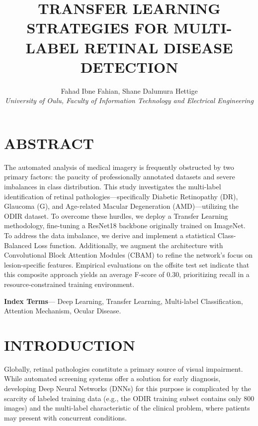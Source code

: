 \documentclass[10pt, letterpaper, twocolumn]{article}
\title{\vspace{0.38in} \fontsize{14}{17}\selectfont \textbf{TRANSFER LEARNING STRATEGIES FOR MULTI-LABEL RETINAL DISEASE DETECTION}}
\author{Fahad Ibne Fahian, Shane Dalumura Hettige \\ 
\textit{University of Oulu, Faculty of Information Technology and Electrical Engineering}}
\date{}
\begin{document}
\maketitle

\section*{ABSTRACT}
The automated analysis of medical imagery is frequently obstructed by two primary factors: the paucity of professionally annotated datasets and severe imbalances in class distribution. This study investigates the multi-label identification of retinal pathologies—specifically Diabetic Retinopathy (DR), Glaucoma (G), and Age-related Macular Degeneration (AMD)—utilizing the ODIR dataset. To overcome these hurdles, we deploy a Transfer Learning methodology, fine-tuning a ResNet18 backbone originally trained on ImageNet. To address the data imbalance, we derive and implement a statistical Class-Balanced Loss function. Additionally, we augment the architecture with Convolutional Block Attention Modules (CBAM) to refine the network's focus on lesion-specific features. Empirical evaluations on the offsite test set indicate that this composite approach yields an average F-score of 0.30, prioritizing recall in a resource-constrained training environment.

\vspace{1em}
\noindent\textbf{Index Terms}— Deep Learning, Transfer Learning, Multi-label Classification, Attention Mechanism, Ocular Disease.

\section{INTRODUCTION}
\label{sec:intro}

Globally, retinal pathologies constitute a primary source of visual impairment. While automated screening systems offer a solution for early diagnosis, developing Deep Neural Networks (DNNs) for this purpose is complicated by the scarcity of labeled training data (e.g., the ODIR training subset contains only 800 images) and the multi-label characteristic of the clinical problem, where patients may present with concurrent conditions.
\end{document}
